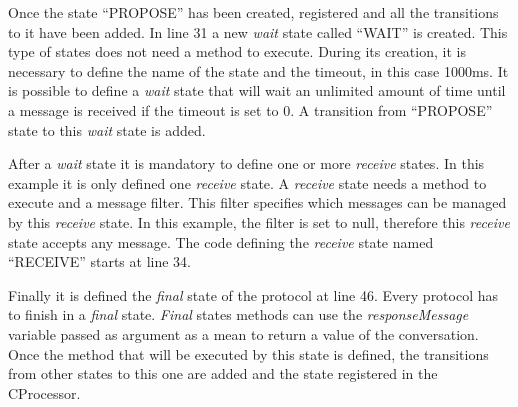 Once the state ``PROPOSE'' has been created, registered and all the transitions to it have been added. In line 31 a new \emph{wait} state called ``WAIT'' is created.  This type of states does not need a method to execute. During its creation, it is necessary to define the name of the state and the timeout, in this case 1000ms. It is possible to define a \textit{wait} state that will wait an unlimited amount of time until a message is received if the timeout is set to 0. A transition from ``PROPOSE'' state to this \emph{wait} state is added.

After a \textit{wait} state it is mandatory to define one or more \textit{receive} states. In this example it is only defined one \textit{receive} state. A \textit{receive} state needs a method to execute and a message filter. This filter specifies which messages can be managed by this \textit{receive} state. In this example, the filter is set to null, therefore this \textit{receive} state accepts any message. The code defining the \textit{receive} state named ``RECEIVE'' starts at line 34.

Finally it is defined the \textit{final} state of the protocol at line 46. Every protocol has to finish in a \textit{final} state. \textit{Final} states methods can use the \textit{responseMessage} variable passed as argument as a mean to return a value of the conversation. Once the method that will be executed by this state is defined, the transitions from other states to this one are added and the state registered in the CProcessor.

